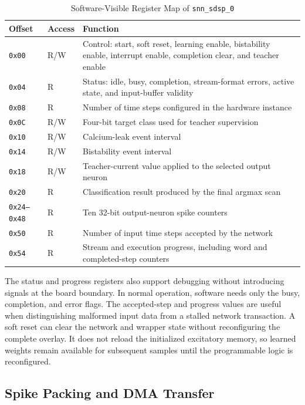 \begin{table}[htbp]
	\centering
	\caption{Software-Visible Register Map of \texttt{snn\_sdsp\_0}}
	\label{tab:snn-axi-register-map}
	\small
	\begin{tabularx}{\linewidth}{@{}l l X@{}}
		\toprule
		\textbf{Offset} & \textbf{Access} & \textbf{Function} \\
		\midrule
		\texttt{0x00} & R/W & Control: start, soft reset, learning enable, bistability enable, interrupt enable, completion clear, and teacher enable \\
		\texttt{0x04} & R & Status: idle, busy, completion, stream-format errors, active state, and input-buffer validity \\
		\texttt{0x08} & R & Number of time steps configured in the hardware instance \\
		\texttt{0x0C} & R/W & Four-bit target class used for teacher supervision \\
		\texttt{0x10} & R/W & Calcium-leak event interval \\
		\texttt{0x14} & R/W & Bistability event interval \\
		\texttt{0x18} & R/W & Teacher-current value applied to the selected output neuron \\
		\texttt{0x20} & R & Classification result produced by the final argmax scan \\
		\texttt{0x24--0x48} & R & Ten 32-bit output-neuron spike counters \\
		\texttt{0x50} & R & Number of input time steps accepted by the network \\
		\texttt{0x54} & R & Stream and execution progress, including word and completed-step counters \\
		\bottomrule
	\end{tabularx}
\end{table}

The status and progress registers also support debugging without introducing signals at the board boundary. In normal operation, software needs only the busy, completion, and error flags. The accepted-step and progress values are useful when distinguishing malformed input data from a stalled network transaction. A soft reset can clear the network and wrapper state without reconfiguring the complete overlay. It does not reload the initialized excitatory memory, so learned weights remain available for subsequent samples until the programmable logic is reconfigured.

\subsection{Spike Packing and DMA Transfer}

